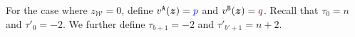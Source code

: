 \documentclass[10 pt,twocolumn,journal]{IEEEtran}
\theoremstyle{plain}
\newcommand{\A}{\mathcal{A}}
\newcommand{\W}{\mathcal{W}}
\newcommand{\z}{\bm{z}}
\newcommand{\p}{\tb{p}}
\newcommand{\q}{\tr{q}}
\renewcommand{\A}{\mathtt{A}}
\newcommand{\B}{\mathtt{B}}
\newcommand{\tb}{\textcolor{blue}}
\newcommand{\tr}{\textcolor{Myred}}
\theoremstyle{definition}
\begin{document}
For the case where $z_\W=0$, define $v^{\A}(\z)=\p$ and $v^{\B}(\z)=\q$.
Recall that $\tau_0=n$ and $\tau'_0=-2$.
We further define $\tau_{b+1}=-2$ and $\tau'_{b'+1}=n+2$.
\end{document}

